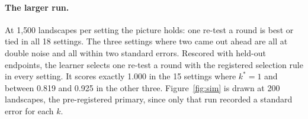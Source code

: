 \paragraph{The larger run.} At 1{,}500 landscapes per setting the picture holds: one
re-test a round is best or tied in all 18 settings. The three settings where two came out ahead
are all at double noise and all within two standard errors. Rescored with held-out endpoints, the learner
selects one re-test a round with the registered selection rule in every setting. It scores exactly 1.000 in the 15 settings where
$k^\ast = 1$ and between 0.819 and 0.925 in the other three. Figure~\ref{fig:sim} is drawn at 200 landscapes,
the pre-registered primary, since only that run recorded a standard error for each $k$.
